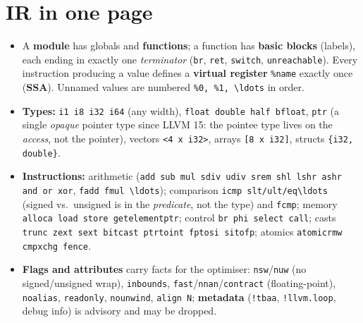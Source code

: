 \documentclass[10pt,a4paper,openany,oneside]{report}
\newcommand{\prio}[1]{\texorpdfstring{\ifcase#1\or{\color{gold}\ding{72}}\or{\color{gold}\ding{72}\ding{72}}\or{\color{gold}\ding{72}\ding{72}\ding{72}}\fi}{}}
\begin{document}
\section{IR in one page \prio{3}}
\begin{mustbox}
\begin{itemize}[nosep]
\item A \textbf{module} has globals and \textbf{functions}; a function has \textbf{basic blocks} (labels), each ending in exactly one \emph{terminator} (\texttt{br}, \texttt{ret}, \texttt{switch}, \texttt{unreachable}). Every instruction producing a value defines a \textbf{virtual register} \texttt{\%name} exactly once (\textbf{SSA}). Unnamed values are numbered \texttt{\%0, \%1, \textbackslash{}ldots} in order.
\item \textbf{Types:} \texttt{i1 i8 i32 i64} (any width), \texttt{float double half bfloat}, \texttt{ptr} (a single \emph{opaque} pointer type since LLVM 15: the pointee type lives on the \emph{access}, not the pointer), vectors \texttt{<4 x i32>}, arrays \texttt{[8 x i32]}, structs \texttt{\{i32, double\}}.
\item \textbf{Instructions:} arithmetic (\texttt{add sub mul sdiv udiv srem shl lshr ashr and or xor}, \texttt{fadd fmul \textbackslash{}ldots}); comparison \texttt{icmp slt/ult/eq\textbackslash{}ldots} (signed vs.\ unsigned is in the \emph{predicate}, not the type) and \texttt{fcmp}; memory \texttt{alloca load store getelementptr}; control \texttt{br phi select call}; casts \texttt{trunc zext sext bitcast ptrtoint fptosi sitofp}; atomics \texttt{atomicrmw cmpxchg fence}.
\item \textbf{Flags and attributes} carry facts for the optimiser: \texttt{nsw}/\texttt{nuw} (no signed/unsigned wrap), \texttt{inbounds}, \texttt{fast}/\texttt{nnan}/\texttt{contract} (floating-point), \texttt{noalias}, \texttt{readonly}, \texttt{nounwind}, \texttt{align N}; \textbf{metadata} (\texttt{!tbaa}, \texttt{!llvm.loop}, debug info) is advisory and may be dropped.
\end{itemize}
\end{mustbox}
\end{document}

